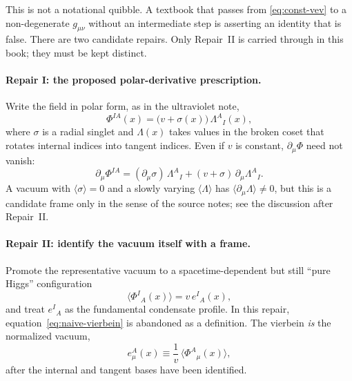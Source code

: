 This is not a notational quibble. A textbook that passes from
\eqref{eq:const-vev} to a non-degenerate \(g_{\mu\nu}\) without an
intermediate step is asserting an identity that is false. There are
two candidate repairs. Only Repair~II is carried through in this book;
they must be kept distinct.

\paragraph{Repair I: the proposed polar-derivative prescription.}
Write the field in polar form, as in the ultraviolet note,
\begin{equation}
  \label{eq:polar}
  \Phi^{IA}(x)=\bigl(v+\sigma(x)\bigr)\,\Lambda^A{}_I(x),
\end{equation}
where \(\sigma\) is a radial singlet and \(\Lambda(x)\) takes values
in the broken coset that rotates internal indices into tangent
indices. Even if \(v\) is constant, \(\partial_\mu\Phi\) need not
vanish:
\begin{equation}
  \label{eq:polar-deriv}
  \partial_\mu\Phi^{IA}
  =(\partial_\mu\sigma)\,\Lambda^A{}_I
   +(v+\sigma)\,\partial_\mu\Lambda^A{}_I.
\end{equation}
A vacuum with \(\langle\sigma\rangle=0\) and a slowly varying
\(\langle\Lambda\rangle\) has \(\langle\partial_\mu\Lambda\rangle\ne0\),
but this is a candidate frame only in the sense of the source
notes; see the discussion after Repair~II.

\paragraph{Repair II: identify the vacuum itself with a frame.}
Promote the representative vacuum to a spacetime-dependent but
still ``pure Higgs'' configuration
\begin{equation}
  \label{eq:higgs-frame}
  \langle\Phi^I{}_A(x)\rangle=v\,e^I{}_A(x),
\end{equation}
and treat \(e^I{}_A\) as the fundamental condensate profile. In this
repair, equation~\eqref{eq:naive-vierbein} is abandoned as a
definition. The vierbein \emph{is} the normalized vacuum,
\begin{equation}
  \label{eq:vev-is-frame}
  e^A_\mu(x)
  \equiv
  \frac1v\,\langle\Phi^{A}{}_\mu(x)\rangle,
\end{equation}
after the internal and tangent bases have been identified.

